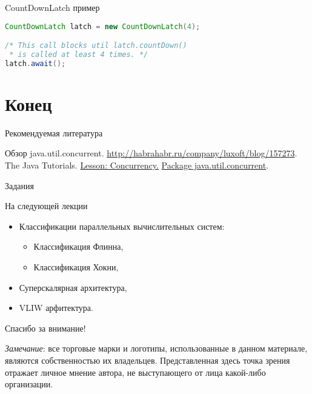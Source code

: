 \begin{frame}[fragile]{CountDownLatch пример}
\begin{lstlisting}[language=Java]
CountDownLatch latch = new CountDownLatch(4);

/* This call blocks util latch.countDown()
 * is called at least 4 times. */
latch.await();
\end{lstlisting}
\end{frame}

\section*{Конец}

\begin{frame}[allowframebreaks]{Рекомендуемая литература}
\begin{thebibliography}{99}
    \bibitem{} Обзор java.util.concurrent.
    \url{http://habrahabr.ru/company/luxoft/blog/157273}.
    \bibitem{} The Java Tutorials.
    \href{http://docs.oracle.com/javase/tutorial/essential/concurrency/index.html}{Lesson: Concurrency.}
    \bibitem{} \href{http://docs.oracle.com/javase/7/docs/api/java/util/concurrent/package-summary.html}{Package java.util.concurrent}.
\end{thebibliography}
\end{frame}

\begin{frame}{Задания}
\end{frame}

\begin{frame}{На следующей лекции}
\begin{itemize}
    \item Классификации параллельных вычислительных систем:
    \begin{itemize}
        \item Классификация Флинна,
        \item Классификация Хокни,
    \end{itemize}
    \item Суперскалярная архитектура,
    \item VLIW арфитектура.
\end{itemize}
\end{frame}

\begin{frame}

{\huge{Спасибо за внимание!}\par}

\vfill

\tiny{\textit{Замечание}: все торговые марки и логотипы, использованные в данном материале, являются собственностью их владельцев. Представленная здесь точка зрения отражает личное мнение автора, не выступающего от лица какой-либо организации.}

\end{frame}


